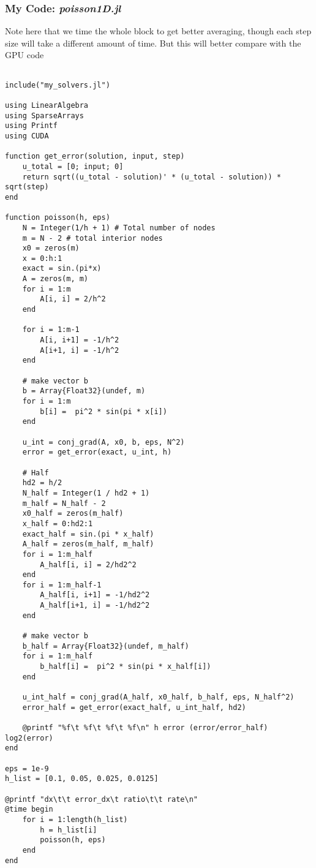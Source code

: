 \documentclass{article}
\begin{document}
\subsubsection{My Code: \textit{poisson1D.jl}}
Note here that we time the whole block to get better averaging, though each step
size will take a different amount of time. But this will better compare with the
GPU code
\begin{lstlisting}

include("my_solvers.jl")

using LinearAlgebra
using SparseArrays
using Printf
using CUDA

function get_error(solution, input, step)
    u_total = [0; input; 0]
    return sqrt((u_total - solution)' * (u_total - solution)) * sqrt(step)
end

function poisson(h, eps)
    N = Integer(1/h + 1) # Total number of nodes
    m = N - 2 # total interior nodes
    x0 = zeros(m)
    x = 0:h:1
    exact = sin.(pi*x)
    A = zeros(m, m)
    for i = 1:m
        A[i, i] = 2/h^2
    end

    for i = 1:m-1
        A[i, i+1] = -1/h^2
        A[i+1, i] = -1/h^2
    end

    # make vector b
    b = Array{Float32}(undef, m)
    for i = 1:m
        b[i] =  pi^2 * sin(pi * x[i]) 
    end

    u_int = conj_grad(A, x0, b, eps, N^2)
    error = get_error(exact, u_int, h)

    # Half
    hd2 = h/2
    N_half = Integer(1 / hd2 + 1)
    m_half = N_half - 2
    x0_half = zeros(m_half)
    x_half = 0:hd2:1
    exact_half = sin.(pi * x_half)
    A_half = zeros(m_half, m_half)
    for i = 1:m_half
        A_half[i, i] = 2/hd2^2
    end
    for i = 1:m_half-1
        A_half[i, i+1] = -1/hd2^2
        A_half[i+1, i] = -1/hd2^2
    end

    # make vector b
    b_half = Array{Float32}(undef, m_half)
    for i = 1:m_half
        b_half[i] =  pi^2 * sin(pi * x_half[i]) 
    end

    u_int_half = conj_grad(A_half, x0_half, b_half, eps, N_half^2)
    error_half = get_error(exact_half, u_int_half, hd2)

    @printf "%f\t %f\t %f\t %f\n" h error (error/error_half) log2(error)
end

eps = 1e-9
h_list = [0.1, 0.05, 0.025, 0.0125]

@printf "dx\t\t error_dx\t ratio\t\t rate\n"
@time begin
    for i = 1:length(h_list)
        h = h_list[i]
        poisson(h, eps)
    end
end
\end{lstlisting}
\end{document}
